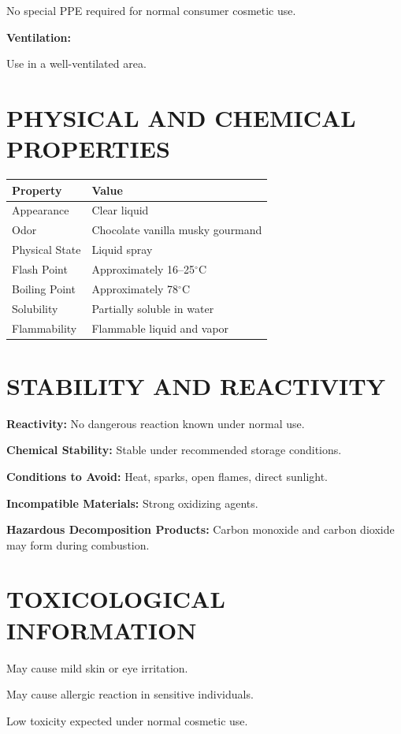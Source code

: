 \documentclass[11pt]{article}
\begin{document}
No special PPE required for normal consumer cosmetic use.

\textbf{Ventilation:}

Use in a well-ventilated area.

\section{PHYSICAL AND CHEMICAL PROPERTIES}

\begin{longtable}{|p{2.5in}|p{3in}|}
\hline
\textbf{Property} & \textbf{Value} \\
\hline
Appearance & Clear liquid \\
\hline
Odor & Chocolate vanilla musky gourmand \\
\hline
Physical State & Liquid spray \\
\hline
Flash Point & Approximately 16--25$^\circ$C \\
\hline
Boiling Point & Approximately 78$^\circ$C \\
\hline
Solubility & Partially soluble in water \\
\hline
Flammability & Flammable liquid and vapor \\
\hline
\end{longtable}

\section{STABILITY AND REACTIVITY}

\textbf{Reactivity:} No dangerous reaction known under normal use.

\textbf{Chemical Stability:} Stable under recommended storage conditions.

\textbf{Conditions to Avoid:} Heat, sparks, open flames, direct sunlight.

\textbf{Incompatible Materials:} Strong oxidizing agents.

\textbf{Hazardous Decomposition Products:} Carbon monoxide and carbon dioxide may form during combustion.

\section{TOXICOLOGICAL INFORMATION}

May cause mild skin or eye irritation.

May cause allergic reaction in sensitive individuals.

Low toxicity expected under normal cosmetic use.
\end{document}
